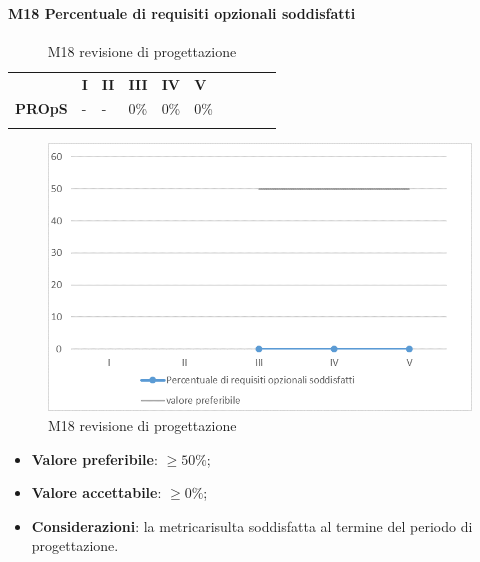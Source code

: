 \paragraph{M18 Percentuale di requisiti opzionali soddisfatti} \mbox{}
\begin{longtable}[H!] {						
		>{}p{50mm}  		
		>{}p{8mm}
		>{}p{8mm}		
		>{}p{8mm}		
		>{}p{8mm}		
		>{}p{8mm}		
		>{}p{8mm}
		>{}p{8mm}
		>{}p{8mm}
		>{}p{8mm}
	}
	\rowcolor{gray!50}
	\textbf{} & \textbf{I} & \textbf{II} & \textbf{III} & \textbf{IV} & \textbf{V} \TBstrut \\ [2mm]
	\textbf{PROpS} & - & - & 0\% & 0\% & 0\% \TBstrut \\ [2mm]
	\rowcolor{white}
	\caption{M18 revisione di progettazione\glo}
\end{longtable}
\begin{figure}[H] 	
\includegraphics[width=\linewidth]{./img/grafici/RP15.png}	
\caption{M18 revisione di progettazione\glo}	
\end{figure}
\begin{itemize}
	\item \textbf{Valore preferibile}: $\ge50\%$;
	\item \textbf{Valore accettabile}: $\ge0\%$;
	\item \textbf{Considerazioni}: la metrica\glosp risulta soddisfatta al termine del periodo di progettazione\glo.
\end{itemize}
